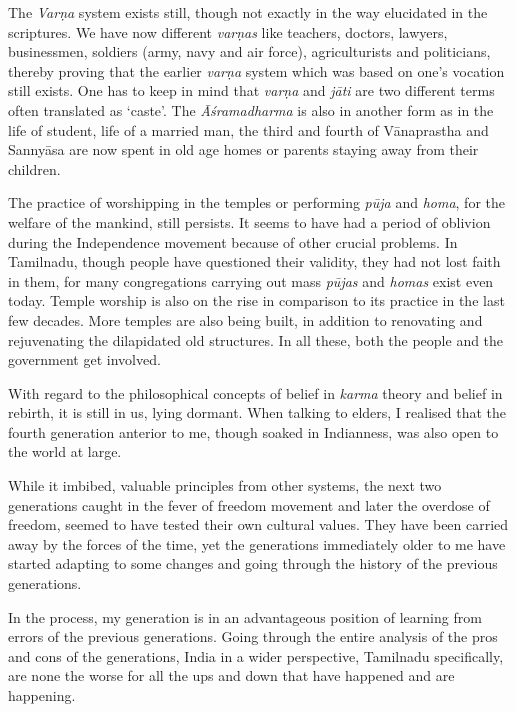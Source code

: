 The \textit{Varṇa} system exists still, though not exactly in the way elucidated in the scriptures. We have now different \textit{varṇas} like teachers, doctors, lawyers, businessmen, soldiers (army, navy and air force), agriculturists and politicians, thereby proving that the earlier \textit{varṇa} system which was based on one’s vocation still exists. One has to keep in mind that \textit{varṇa} and \textit{jāti} are two different terms often translated as ‘caste’. The \textit{Āśramadharma} is also in another form as in the life of student, life of a married man, the third and fourth of Vānaprastha and Sannyāsa are now spent in old age homes or parents staying away from their children.

The practice of worshipping in the temples or performing \textit{pūja} and \textit{homa}, for the welfare of the mankind, still persists. It seems to have had a period of oblivion during the Independence movement because of other crucial problems. In Tamilnadu, though people have questioned their validity, they had not lost faith in them, for many congregations carrying out mass \textit{pūjas} and \textit{homas} exist even today. Temple worship is also on the rise in comparison to its practice in the last few decades. More temples are also being built, in addition to renovating and rejuvenating the dilapidated old structures. In all these, both the people and the government get involved.

With regard to the philosophical concepts of belief in \textit{karma} theory and belief in rebirth, it is still in us, lying dormant. When talking to elders, I realised that the fourth generation anterior to me, though soaked in Indianness, was also open to the world at large.

While it imbibed, valuable principles from other systems, the next two generations caught in the fever of freedom movement and later the overdose of freedom, seemed to have tested their own cultural values. They have been carried away by the forces of the time, yet the generations immediately older to me have started adapting to some changes and going through the history of the previous generations.

In the process, my generation is in an advantageous position of learning from errors of the previous generations. Going through the entire analysis of the pros and cons of the generations, India in a wider perspective, Tamilnadu specifically, are none the worse for all the ups and down that have happened and are happening.


